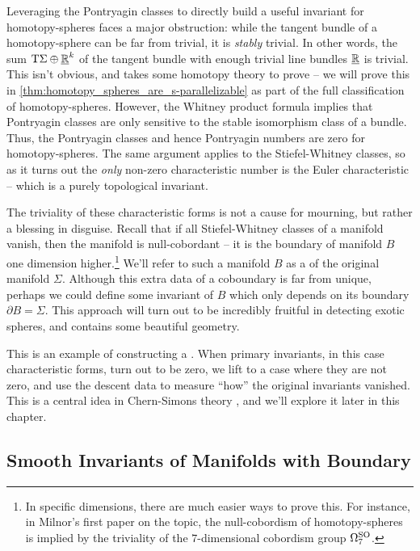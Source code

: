 Leveraging the Pontryagin classes to directly build a useful invariant for homotopy-spheres faces a major obstruction: while the tangent bundle of a homotopy-sphere can be far from trivial, it is \emph{stably} trivial. In other words, the sum $\mathrm{T} \Sigma\oplus \underline{\mathbb{R}}^k$ of the tangent bundle with enough trivial line bundles $\underline{\mathbb{R}}$ is trivial. This isn't obvious, and takes some homotopy theory to prove -- we will prove this in \cref{thm:homotopy_spheres_are_s-parallelizable} as part of the full classification of homotopy-spheres. However, the Whitney product formula implies that Pontryagin classes are only sensitive to the stable isomorphism class of a bundle. Thus, the Pontryagin classes and hence Pontryagin numbers are zero for homotopy-spheres. The same argument applies to the Stiefel-Whitney classes, so as it turns out the \emph{only} non-zero characteristic number is the Euler characteristic -- which is a purely topological invariant.

The triviality of these characteristic forms is not a cause for mourning, but rather a blessing in disguise. Recall that if all Stiefel-Whitney classes of a manifold vanish, then the manifold is null-cobordant -- it is the boundary of manifold $B$ one dimension higher.\footnote{In specific dimensions, there are much easier ways to prove this. For instance, in Milnor's first paper \cite{milnor1956manifolds} on the topic, the null-cobordism of homotopy-spheres is implied by the triviality of the $7$-dimensional cobordism group $\Omega^{\operatorname{SO}}_7$.} We'll refer to such a manifold $B$ as a  of the original manifold $\Sigma$. Although this extra data of a coboundary is far from unique, perhaps we could define some invariant of $B$ which only depends on its boundary $\partial B=\Sigma$. This approach will turn out to be incredibly fruitful in detecting exotic spheres, and contains some beautiful geometry.

\begin{remark}
	This is an example of constructing a . When primary invariants, in this case characteristic forms, turn out to be zero, we lift to a case where they are not zero, and use the descent data to measure ``how'' the original invariants vanished. This is a central idea in Chern-Simons theory \cite{chernsimons1974geometricinvariants}, and we'll explore it later in this chapter.
\end{remark}

\subsection*{Smooth Invariants of Manifolds with Boundary}

